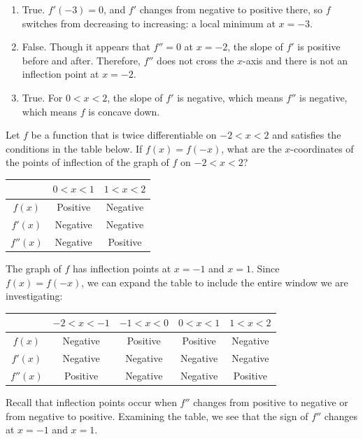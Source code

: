 \begin{Answer}[ref = shape2]
\begin{enumerate}
\item True. $f'(-3) = 0$, and $f'$ changes from negative to positive there,
so $f$ switches from decreasing to increasing: a local minimum at $x = -3$.
\item False. Though it appears that $f'' = 0$ at $x = -2$, the slope of $f'$ 
is positive before and after. Therefore, $f''$ does not cross the $x$-axis 
and there is not an inflection point at $x = -2$. 
\item True. For $ 0 < x < 2$, the slope of $f'$ is negative, which means 
$f''$ is negative, which means $f$ is concave down. 
\end{enumerate}
\end{Answer}

\begin{Exercise} Let $f$ be a 
function that is twice differentiable on $-2 < x< 2$ and satisfies the 
conditions in the table below. If $f(x) = f(-x)$, what are the $x$-coordinates 
of the points of inflection of the graph of $f$ on $-2 < x < 2$?

\begin{tabular}{|c|c|c|}\hline
 & $0 < x < 1$ & $1 < x < 2$\\\hline
 $f(x)$ & Positive & Negative\\\hline
 $f'(x)$ & Negative & Negative\\\hline
 $f''(x)$ & Negative & Positive\\\hline
\end{tabular}
\end{Exercise}

\begin{Answer}[ref = shape3]
The graph of $f$ has inflection points at $x = -1$ and $x = 1$. Since $f(x) = 
f(-x)$, we can expand the table to include the entire window we are 
investigating:
\begin{tabular}{|c|c|c|c|c|}\hline
 & $-2 < x < -1$ & $-1 < x < 0$ & $0 < x < 1$ & $1 < x < 2$\\\hline
 $f(x)$ & Negative & Positive & Positive & Negative\\\hline
 $f'(x)$ & Negative & Negative & Negative & Negative\\\hline
 $f''(x)$ & Positive & Negative & Negative & Positive\\\hline
\end{tabular}
Recall that inflection points occur when $f''$ changes from positive to 
negative or from negative to positive. Examining the table, we see that the 
sign of $f''$ changes at $x = -1$ and $x = 1$. 
\end{Answer}
